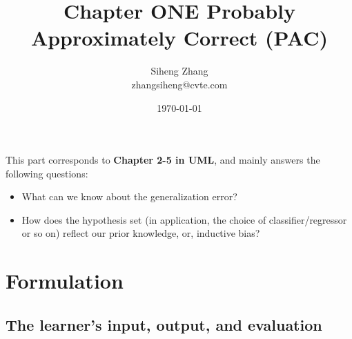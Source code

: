 \documentclass{article}
\author{Siheng Zhang\\zhangsiheng@cvte.com}
\title{Chapter ONE Probably Approximately Correct (PAC)}
\date{\today}
\begin{document}
\maketitle  


This part corresponds to \textbf{Chapter 2-5 in UML}, and mainly answers the following questions:

\begin{itemize}
\item What can we know about the generalization error?
\item How does the hypothesis set (in application, the choice of classifier/regressor or so on) reflect our prior knowledge, or, inductive bias?
\end{itemize}

\tableofcontents
\newpage

\section{Formulation}

\subsection{The learner's input, output, and evaluation}
\end{document}
